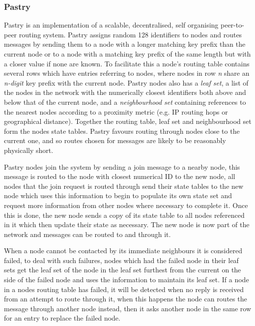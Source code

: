 \documentclass{article}
\begin{document}
\subsubsection{Pastry}
Pastry \cite{pastry} is an implementation of a scalable, decentralised, self organising peer-to-peer routing system. Pastry assigns random 128 identifiers to nodes and routes messages by sending them to a node with a longer matching key prefix than the current node or to a node with a matching key prefix of the same length but with a closer value if none are known.
To facilitate this a node's routing table contains several rows which have entries referring to nodes, where nodes in row \textit{n} share an \textit{n-digit} key prefix with the current node.
Pastry nodes also has a \textit{leaf set}, a list of the nodes in the network with the numerically closest identifiers both above and below that of the current node, and a \textit{neighbourhood set} containing references to the nearest nodes according to a proximity metric (e.g. IP routing hops or geographical distance). Together the routing table, leaf set and neighbourhood set form the nodes state tables.
Pastry favours routing through nodes close to the current one, and so routes chosen for messages are likely to be reasonably physically short.

Pastry nodes join the system by sending a join message to a nearby node, this message is routed to the node with closest numerical ID to the new node, all nodes that the join request is routed through send their state tables to the new node which uses this information to begin to populate its own state set and request more information from other nodes where necessary to complete it. Once this is done, the new node sends a copy of its state table to all nodes referenced in it which then update their state as necessary. The new node is now part of the network and messages can be routed to and through it.

When a node cannot be contacted by its immediate neighbours it is considered failed, to deal with such failures, nodes which had the failed node in their leaf sets get the leaf set of the node in the leaf set furthest from the current on the side of the failed node and uses the information to maintain its leaf set. If a node in a nodes routing table has failed, it will be detected when no reply is received from an attempt to route through it, when this happens the node can routes the message through another node instead, then it asks another node in the same row for an entry to replace the failed node.
\end{document}
